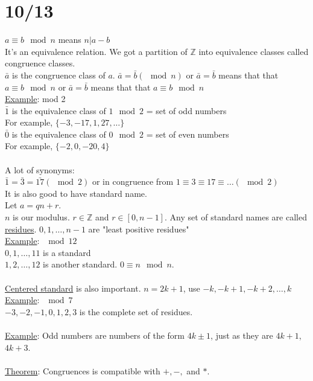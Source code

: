\documentclass[13pt]{article}
\begin{document}
\section*{10/13}
	$a \equiv b \mod n$ means $n | a-b$\\
	It's an equivalence relation. We got a partition of $\mathbb{Z}$ into 
	equivalence classes called congruence classes. \\
	$\bar{a}$ is the congruence class of $a$.
	$\bar{a} = \bar{b} (\mod n)$ or $\bar{a} = \bar{b}$ means that that $a 
	\equiv b \mod n$ or $\bar{a} = \bar{b}$ means that that $a \equiv b \mod 
	n$\\
	\underline{Example}: mod 2\\
	$\bar{1}$ is the equivalence class of $1 \mod 2$ = set of odd numbers\\
	For example, $\{-3, -17, 1, 27, \ldots \}$\\
	$\bar{0}$ is the equivalence class of $0 \mod 2$ = set of even numbers\\
	For example, $\{ -2, 0, -20, 4\}$\\\\
	A lot of synonyms:\\
	$\bar{1} = \bar{3} = \bar{17} (\mod 2)$ or in congruence from $1 \equiv
	3 \equiv 17 \equiv \ldots (\mod 2)$\\
	It is also good to have standard name. \\
	Let $a = qn + r$. \\
	$n$ is our modulus. $r \in \mathbb{Z}$ and $r \in [0, n-1]$.
	Any set of standard names are called \underline{residues}. $0, 1, \ldots,
	n - 1$ are "least positive residues"\\
	\underline{Example}: $\mod 12$\\
	$0, 1, \ldots, 11$ is a standard\\
	$1, 2, \ldots, 12$ is another standard. $0 \equiv n \mod n$.\\\\
	\underline{Centered standard} is also important.
	$n = 2k +1$, use $-k, -k+1, -k + 2, \ldots, k$\\
	\underline{Example}: $\mod 7$\\
	$-3, -2, -1, 0, 1, 2, 3$ is the complete set of residues.\\\\
	\underline{Example}: Odd numbers are numbers of the form $4k \pm 1$, just
	as they are $4k+1$, $4k +3$.\\\\
	\underline{Theorem}: Congruences is compatible with $+, -,$ and $*$.\\
\end{document}
